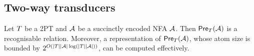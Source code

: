 \subsection{Two-way transducers}\label{sec-2way}



\begin{lemma}\label{lem-2pt}
Let $T$ be a 2PT and $\mathcal{A}$ be a succinctly encoded NFA $\mathcal{A}$. Then $\textsf{Pre}_{T}(\mathcal{A})$ is a recognisable relation. Moreover, a representation of $\textsf{Pre}_{T}(\mathcal{A})$, whose atom size is bounded by $2^{O(|T||\mathcal{A}|\log (|T||\mathcal{A}|))}$, can be computed effectively.
\end{lemma}

